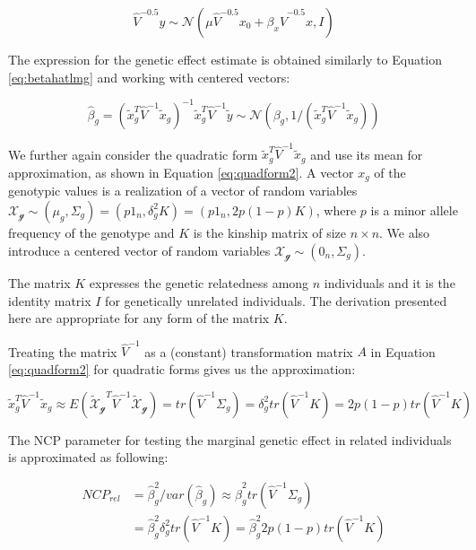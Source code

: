 \documentclass[]{book}
\begin{document}
\begin{equation}
  \hat{V}^{-0.5} y \sim \mathcal{N} (\mu \hat{V}^{-0.5} x_0 + \beta_x \hat{V}^{-0.5} x , I)
\label{eq:lmmg2}
\end{equation}

The expression for the genetic effect estimate is obtained similarly to
Equation \eqref{eq:betahatlmg} and working with centered vectors:

\begin{equation}
  \hat{\beta}_g  = (\tilde{x}_g^T \hat{V}^{-1} \tilde{x}_g)^{-1} \tilde{x}_g^T \hat{V}^{-1} \tilde{y} \sim \mathcal{N} (\beta_g, 1 / (\tilde{x}_g^T \hat{V}^{-1} \tilde{x}_g))
\label{eq:betahatlmmg}
\end{equation}

We further again consider the quadratic form
\(\tilde{x}_g^T \hat{V}^{-1} \tilde{x}_g\) and use its mean for
approximation, as shown in Equation \eqref{eq:quadform2}. A vector \(x_g\)
of the genotypic values is a realization of a vector of random variables
\(\mathcal{X_g} \sim (\mu_g, \Sigma_g) = (p 1_n, \delta_g^2 K) = (p 1_n, 2 p (1 - p) K)\),
where \(p\) is a minor allele frequency of the genotype and \(K\) is the
kinship matrix of size \(n \times n\). We also introduce a centered
vector of random variables \(\mathcal{X_g} \sim (0_n, \Sigma_g)\).

The matrix \(K\) expresses the genetic relatedness among \(n\)
individuals and it is the identity matrix \(I\) for genetically
unrelated individuals. The derivation presented here are appropriate for
any form of the matrix \(K\).

Treating the matrix \(\hat{V}^{-1}\) as a (constant) transformation
matrix \(A\) in Equation \eqref{eq:quadform2} for quadratic forms gives us
the approximation:

\begin{equation}
\tilde{x}_g^T \hat{V}^{-1} \tilde{x}_g \approx E(\mathcal{\tilde{X}_g}^T \hat{V}^{-1} \mathcal{\tilde{X}_g}) = tr(\hat{V}^{-1} \Sigma_g) = \delta_g^2 tr(\hat{V}^{-1} K) = 2 p (1 - p) tr(\hat{V}^{-1} K)
\label{eq:varbetahatlmmg}
\end{equation}

The NCP parameter for testing the marginal genetic effect in related
individuals is approximated as following:

\begin{equation}
\begin{split}
NCP_{rel} & = \hat{\beta}_g^2 / var(\hat{\beta}_g) \approx \hat{\beta}_g^2 tr(\hat{V}^{-1} \Sigma_g) \\
 & = \hat{\beta}_g^2 \delta_g^2 tr(\hat{V}^{-1} K) = \hat{\beta}_g^2 2 p (1 - p) tr(\hat{V}^{-1} K)
\end{split}
\label{eq:ncplmg}
\end{equation}
\end{document}

